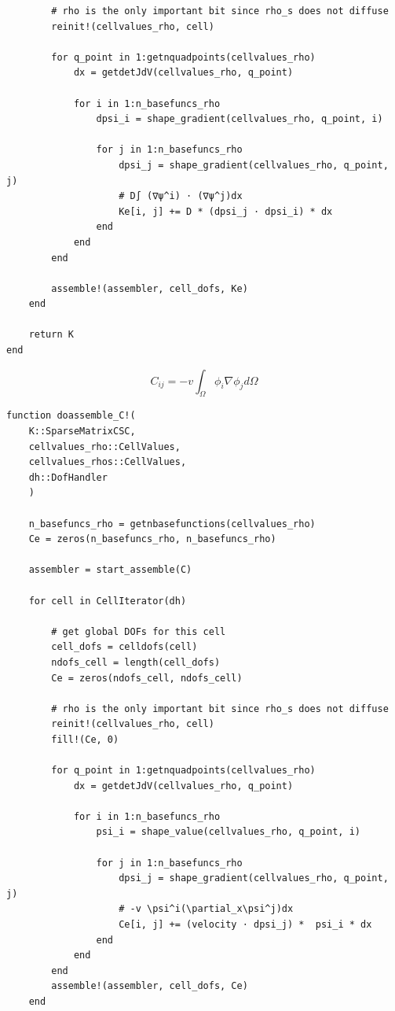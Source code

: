 \begin{appendices}
\begin{lstlisting}
        # rho is the only important bit since rho_s does not diffuse
        reinit!(cellvalues_rho, cell)

        for q_point in 1:getnquadpoints(cellvalues_rho)
            dx = getdetJdV(cellvalues_rho, q_point)

            for i in 1:n_basefuncs_rho
                dpsi_i = shape_gradient(cellvalues_rho, q_point, i)

                for j in 1:n_basefuncs_rho
                    dpsi_j = shape_gradient(cellvalues_rho, q_point, j)
                    # D∫ (∇ψ^i) ⋅ (∇ψ^j)dx
                    Ke[i, j] += D * (dpsi_j ⋅ dpsi_i) * dx
                end
            end
        end

        assemble!(assembler, cell_dofs, Ke)
    end

    return K
end
\end{lstlisting}
\begin{equation}
    C_{ij} = -v\int_{\Omega} \phi_i \nabla \phi_j d\Omega
\end{equation}
\begin{lstlisting}
function doassemble_C!(
    K::SparseMatrixCSC, 
    cellvalues_rho::CellValues, 
    cellvalues_rhos::CellValues, 
    dh::DofHandler
    )

    n_basefuncs_rho = getnbasefunctions(cellvalues_rho)
    Ce = zeros(n_basefuncs_rho, n_basefuncs_rho)

    assembler = start_assemble(C)

    for cell in CellIterator(dh)
        
        # get global DOFs for this cell
        cell_dofs = celldofs(cell)
        ndofs_cell = length(cell_dofs)
        Ce = zeros(ndofs_cell, ndofs_cell)

        # rho is the only important bit since rho_s does not diffuse
        reinit!(cellvalues_rho, cell)
        fill!(Ce, 0)

        for q_point in 1:getnquadpoints(cellvalues_rho)
            dx = getdetJdV(cellvalues_rho, q_point)

            for i in 1:n_basefuncs_rho
                psi_i = shape_value(cellvalues_rho, q_point, i)

                for j in 1:n_basefuncs_rho
                    dpsi_j = shape_gradient(cellvalues_rho, q_point, j)
                    # -v \psi^i(\partial_x\psi^j)dx
                    Ce[i, j] += (velocity ⋅ dpsi_j) *  psi_i * dx
                end
            end
        end
        assemble!(assembler, cell_dofs, Ce)
    end


\end{lstlisting}
\end{appendices}
